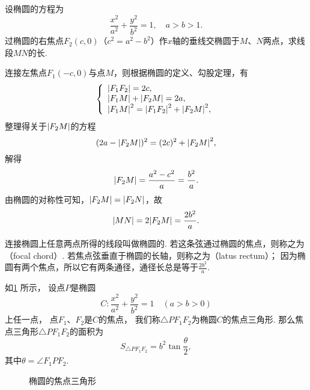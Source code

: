 \begin{example}
设椭圆的方程为\[
\frac{x^2}{a^2}+\frac{y^2}{b^2}=1, \quad a>b>1.
\]过椭圆的右焦点\(F_2(c,0)\)（\(c^2=a^2-b^2\)）作\(x\)轴的垂线交椭圆于\(M\)、\(N\)两点，求线段\(MN\)的长.
\begin{solution}
连接左焦点\(F_1(-c,0)\)与点\(M\)，则根据椭圆的定义、勾股定理，有\[
\left\{ \begin{array}{l}
\abs{F_1 F_2} = 2c, \\
\abs{F_1 M} + \abs{F_2 M} = 2a, \\
\abs{F_1 M}^2 = \abs{F_1 F_2}^2 + \abs{F_2 M}^2,
\end{array} \right.
\]整理得关于\(\abs{F_2 M}\)的方程\[
(2a - \abs{F_2 M})^2 = (2c)^2 + \abs{F_2 M}^2,
\]解得\[
\abs{F_2 M} = \frac{a^2 - c^2}{a} = \frac{b^2}{a}.
\]由椭圆的对称性可知，\(\abs{F_2 M} = \abs{F_2 N}\)，故\[
\abs{MN} = 2\abs{F_2 M} = \frac{2 b^2}{a}.
\]
\end{solution}

连接椭圆上任意两点所得的线段叫做椭圆的.
若这条弦通过椭圆的焦点，则称之为（focal chord）.
若焦点弦垂直于椭圆的长轴，则称之为（latus rectum）；
因为椭圆有两个焦点，所以它有两条通径，通径长总是等于\(\frac{2b^2}{a}\).
\end{example}

\begin{theorem}[椭圆的焦点三角形]
如\cref{figure:解析几何.椭圆的焦点三角形} 所示，
设点\(P\)是椭圆\[
	C: \frac{x^2}{a^2} + \frac{y^2}{b^2} = 1
	\quad(a>b>0)
\]上任一点，
点\(F_1\)、\(F_2\)是\(C\)的焦点，
我们称\(\triangle P F_1 F_2\)为椭圆\(C\)的焦点三角形.
那么焦点三角形\(\triangle P F_1 F_2\)的面积为\[
S_{\triangle P F_1 F_2} = b^2 \tan\frac{\theta}{2},
\]其中\(\theta=\angle{F_1 P F_2}\).

\begin{figure}[ht]
\centering
{}
\caption{椭圆的焦点三角形}
\label{figure:解析几何.椭圆的焦点三角形}
\end{figure}
\end{theorem}

